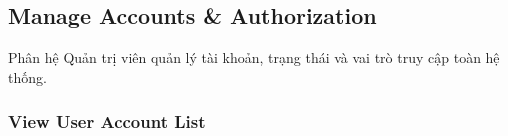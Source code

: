 \documentclass[12pt,a4paper,oneside]{report}
\begin{document}

\subsection{Manage Accounts \& Authorization}
\label{subsec:manage-accounts-authorization}

Phân hệ Quản trị viên quản lý tài khoản, trạng thái và vai trò truy cập toàn hệ thống.

\subsubsection{View User Account List}
\label{subsubsec:view-user-account-list}
\end{document}
